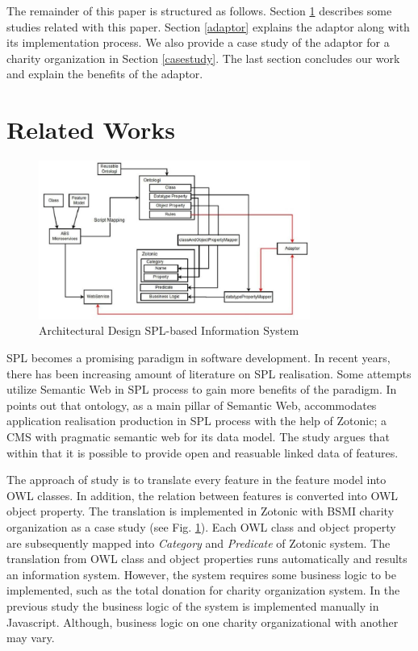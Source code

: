 \documentclass[conference]{IEEEtran}
\begin{document}
The remainder of this paper is structured as follows. Section \ref{relatedworks} describes some studies related with this paper. Section \ref{adaptor} explains the adaptor along with its implementation process. We also provide a case study of the adaptor for a charity organization in Section \ref{casestudy}. The last section concludes our work and explain the benefits of the adaptor. 

\section{Related Works} \label{relatedworks}

\begin{figure}[h]
\centering
\includegraphics[width=3.5in]{overallsysdes}

\caption{Architectural Design SPL-based Information System}
\label{fig_sysdes}
\end{figure}

SPL becomes a promising paradigm in software development. In recent years, there has been increasing amount of literature on SPL realisation. Some attempts utilize Semantic Web in SPL process to gain more benefits of the paradigm. In \cite{fmontology} points out that ontology, as a main pillar of Semantic Web, accommodates application realisation production in SPL process with the help of Zotonic; a CMS with pragmatic semantic web for its data model. The study argues that within that it is possible to provide open and reasuable linked data of features.

The approach of study \cite{fmontology} is to translate every feature in the feature model into OWL classes. In addition, the relation between features is converted into OWL object property. The translation is implemented in Zotonic with BSMI charity organization as a case study (see Fig. \ref{fig_sysdes}). Each OWL class and object property are subsequently mapped into \textit{Category} and \textit{Predicate} of Zotonic system. The translation from OWL class and object properties runs automatically and results an information system. However, the system requires some business logic to be implemented, such as the total donation for charity organization system. In the previous study \cite{bravyto} the business logic of the system is implemented manually in Javascript. Although, business logic on one charity organizational with another may vary. 
\end{document}
